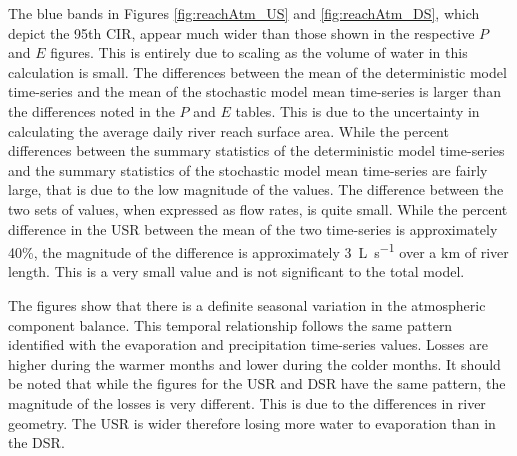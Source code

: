 \begin{linenumbers}
\subtabletop
\begin{table}[htbp]
	\centering
	\caption[USR deterministic and stochastic model time-series total estimated atmospheric contribution to the water balance model numeric results.]{USR deterministic and stochastic model time-series total estimated atmospheric contribution to the water balance model numeric results.  Total daily contribution is presented in units of \si{\cubic\meter\per\second\per\kilo\meter} (\si{\cfs\per\mile}).}
	\label{tab:reachAtm_US}
	
\end{table}
\tablevspace
\begin{table}[htbp]
	\centering
	\caption[DSR deterministic and stochastic model time-series total estimated atmospheric contribution to the water balance model numeric results.]{DSR deterministic and stochastic model time-series total estimated atmospheric contribution to the water balance model numeric results.  Total daily contribution is presented in units of \si{\cubic\meter\per\second\per\kilo\meter} (\si{\cfs\per\mile}).}
	\label{tab:reachAtm_DS}
	
\end{table}

The blue bands in Figures \ref{fig:reachAtm_US} and \ref{fig:reachAtm_DS}, which depict the 95th CIR, appear much wider than those shown in the respective $ P $ and $ E $ figures.  This is entirely due to scaling as the volume of water in this calculation is small.  The differences between the mean of the deterministic model time-series and the mean of the stochastic model mean time-series is larger than the differences noted in the $ P $ and $ E $ tables.  This is due to the uncertainty in calculating the average daily river reach surface area.  While the percent differences between the summary statistics of the deterministic model time-series and the summary statistics of the stochastic model mean time-series are fairly large, that is due to the low magnitude of the values.  The difference between the two sets of values, when expressed as flow rates, is quite small.  While the percent difference in the USR between the mean of the two time-series is approximately 40\%, the magnitude of the difference is approximately \SI{3}{\liter\per\second} over a \si{\kilo\meter} of river length.  This is a very small value and is not significant to the total model.  

The figures show that there is a definite seasonal variation in the atmospheric component balance.  This temporal relationship follows the same pattern identified with the evaporation and precipitation time-series values.  Losses are higher during the warmer months and lower during the colder months.  It should be noted that while the figures for the USR and DSR have the same pattern, the magnitude of the losses is very different.  This is due to the differences in river geometry.  The USR is wider therefore losing more water to evaporation than in the DSR.


\end{linenumbers}
